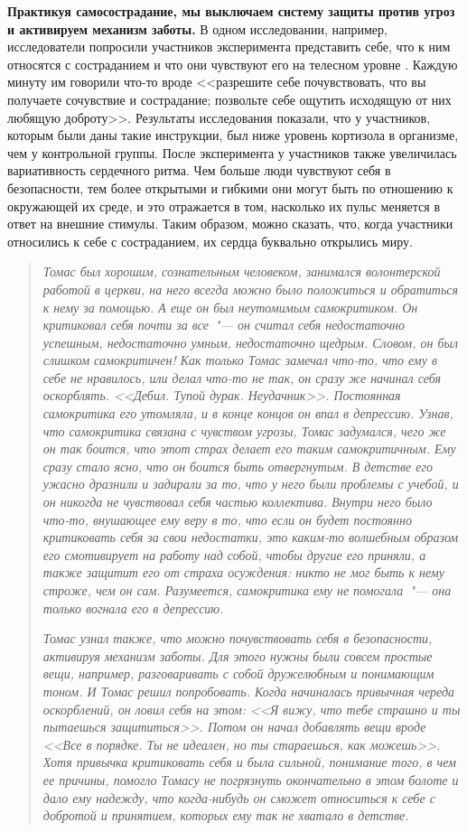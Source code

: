 \textbf{Практикуя самосострадание, мы выключаем систему защиты против угроз и активируем механизм заботы.} В одном исследовании, например, исследователи попросили участников эксперимента представить себе, что к ним относятся с состраданием и что они чувствуют его на телесном уровне \cite{54}. Каждую минуту им говорили что-то вроде <<разрешите себе почувствовать, что вы получаете сочувствие и сострадание; позвольте себе ощутить исходящую от них любящую доброту>>. Результаты исследования показали, что у участников, которым были даны такие инструкции, был ниже уровень кортизола в организме, чем у контрольной группы. После эксперимента у участников также увеличилась вариативность сердечного ритма. Чем больше люди чувствуют себя в безопасности, тем более открытыми и гибкими они могут быть по отношению к окружающей их среде, и это отражается в том, насколько их пульс меняется в ответ на внешние стимулы. Таким образом, можно сказать, что, когда участники относились к себе с состраданием, их сердца буквально открылись миру.

\vspace{4ex}

\begin{quotation}
	\textit{Томас был хорошим, сознательным человеком, занимался волонтерской работой в церкви, на него всегда можно было положиться и обратиться к нему за помощью. А еще он был неутомимым самокритиком. Он критиковал себя почти за все~"--- он считал себя недостаточно успешным, недостаточно умным, недостаточно щедрым. Словом, он был слишком самокритичен! Как только Томас замечал что-то, что ему в себе не нравилось, или делал что-то не так, он сразу же начинал себя оскорблять. <<Дебил. Тупой дурак. Неудачник>>. Постоянная самокритика его утомляла, и в конце концов он впал в депрессию. Узнав, что самокритика связана с чувством угрозы, Томас задумался, чего же он так боится, что этот страх делает его таким самокритичным. Ему сразу стало ясно, что он боится быть отвергнутым. В детстве его ужасно дразнили и задирали за то, что у него были проблемы с учебой, и он никогда не чувствовал себя частью коллектива. Внутри него было что-то, внушающее ему веру в то, что если он будет постоянно критиковать себя за свои недостатки, это каким-то волшебным образом его смотивирует на работу над собой, чтобы другие его приняли, а также защитит его от страха осуждения: никто не мог быть к нему строже, чем он сам. Разумеется, самокритика ему не помогала~"--- она только вогнала его в депрессию.}
	
	\textit{Томас узнал также, что можно почувствовать себя в безопасности, активируя механизм заботы. Для этого нужны были совсем простые вещи, например, разговаривать с собой дружелюбным и понимающим тоном. И Томас решил попробовать. Когда начиналась привычная череда оскорблений, он ловил себя на этом: <<Я вижу, что тебе страшно и ты пытаешься защититься>>. Потом он начал добавлять вещи вроде <<Все в порядке. Ты не идеален, но ты стараешься, как можешь>>. Хотя привычка критиковать себя и была сильной, понимание того, в чем ее причины, помогло Томасу не погрязнуть окончательно в этом болоте и дало ему надежду, что когда-нибудь он сможет относиться к себе с добротой и принятием, которых ему так не хватало в детстве.}
\end{quotation}

